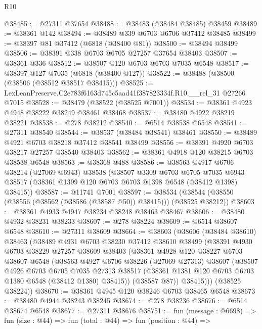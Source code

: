 \begin{lexlean}{R10}
\begin{coremodule}
@38485 := @27311 @37654
@38488 := @38483 (@38484 @38485) @38459
@38489 := @38361 @142
@38494 := @38489 @339 @6703 @6706 @37412 @38485
@38499 := @38397 @81 @37412 (@6818 (@38400 @81))
@38500 := @38494 @38499
@38506 := @38391 @338 @6703 @6705 @27257 @37654 @38403
@38507 := @38361 @336
@38512 := @38507 @120 @6703 @6703 @7035 @6548
@38517 := @38397 @127 @7035 (@6818 (@38400 @127))
@38522 := @38488 (@38500 (@38506 (@38512 @38517 @38415)))
@38525 := LexLeanPreserve.C2e783f6163d745c5aad41f387823334f.R10.__rel_31 @27266 @7015
@38528 := @38479 (@38522 (@38525 @7001))
@38534 := @38361 @4923 @4948 @38222 @38249 @38461 @38468
@38537 := @38480 @4922 @38219 @38221
@38538 := @278 @38212
@38540 := @6514 @38538 @6548
@38541 := @27311 @38540
@38544 := @38537 (@38484 @38541) @38461
@38550 := @38489 @4921 @6703 @38218 @37412 @38541 @38499
@38556 := @38391 @4920 @6703 @38217 @27257 @38540 @38403
@38562 := @38361 @4918 @120 @38215 @6703 @38538 @6548
@38563 := @38368 @488
@38586 := @38563
    @4917
    @6706
    @38214
    (@27069 @6943)
    @38538
    (@38507
      @3309
      @6703
      @6705
      @7035
      @6943
      @38517
      (@38361 @1399 @120 @6703 @6703 @1398 @6548 (@38412 @1398) @38415))
@38587 := @11741 @7001
@38597 := @38534 (@38544 (@38550 (@38556 (@38562 (@38586 (@38587 @50)) @38415))) (@38525 @38212))
@38603 := @38361 @4933 @4947 @38234 @38248 @38463 @38467
@38606 := @38480 @4932 @38231 @38233
@38607 := @278 @38224
@38609 := @6514 @38607 @6548
@38610 := @27311 @38609
@38664 := @38603
    (@38606
      (@38484 @38610)
      @38463
      (@38489
        @4931
        @6703
        @38230
        @37412
        @38610
        @38499
        (@38391
          @4930
          @6703
          @38229
          @27257
          @38609
          @38403
          (@38361
            @4928
            @120
            @38227
            @6703
            @38607
            @6548
            (@38563
              @4927
              @6706
              @38226
              (@27069 @27313)
              @38607
              (@38507
                @4926
                @6703
                @6705
                @7035
                @27313
                @38517
                (@38361 @1381 @120 @6703 @6703 @1380 @6548 (@38412 @1380) @38415))
              (@38587 @87))
            @38415)))
      (@38525 @38224))
@38670 := @38361 @4945 @120 @38246 @6703 @38465 @6548
@38673 := @38480 @4944 @38243 @38245
@38674 := @278 @38236
@38676 := @6514 @38674 @6548
@38677 := @27311 @38676
@38751 := fun (message : @6698) =>
  fun (size : @44) =>
  fun (total : @44) =>
  fun (position : @44) =>

\end{coremodule}
\end{lexlean}
